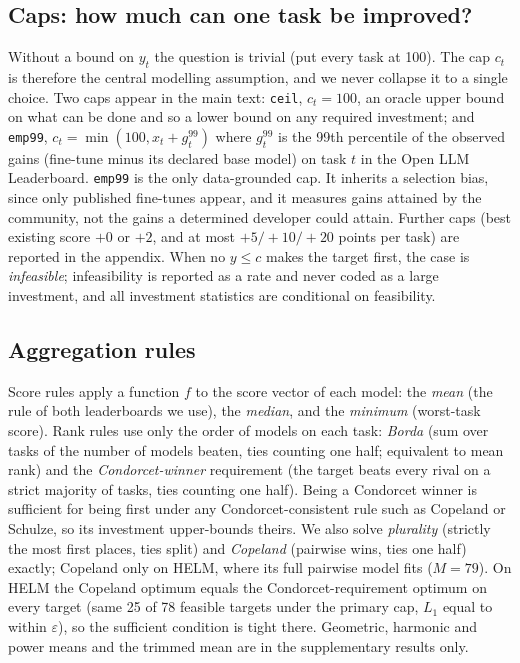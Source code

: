 \documentclass{article}
\begin{document}
\subsection{Caps: how much can one task be improved?}
\label{sec:caps}
Without a bound on $y_t$ the question is trivial (put every task at 100). The cap $c_t$ is therefore the central modelling assumption, and we never collapse it to a single choice. Two caps appear in the main text: \texttt{ceil}, $c_t=100$, an oracle upper bound on what can be done and so a lower bound on any required investment; and \texttt{emp99}, $c_t=\min(100,x_t+g_t^{99})$ where $g_t^{99}$ is the 99th percentile of the observed gains (fine-tune minus its declared base model) on task $t$ in the Open LLM Leaderboard. \texttt{emp99} is the only data-grounded cap. It inherits a selection bias, since only published fine-tunes appear, and it measures gains attained by the community, not the gains a determined developer could attain. Further caps (best existing score $+0$ or $+2$, and at most $+5/+10/+20$ points per task) are reported in the appendix. When no $y\le c$ makes the target first, the case is \emph{infeasible}; infeasibility is reported as a rate and never coded as a large investment, and all investment statistics are conditional on feasibility.

\subsection{Aggregation rules}
\label{sec:rules}
Score rules apply a function $f$ to the score vector of each model: the \emph{mean} (the rule of both leaderboards we use), the \emph{median}, and the \emph{minimum} (worst-task score). Rank rules use only the order of models on each task: \emph{Borda} (sum over tasks of the number of models beaten, ties counting one half; equivalent to mean rank) and the \emph{Condorcet-winner} requirement (the target beats every rival on a strict majority of tasks, ties counting one half). Being a Condorcet winner is sufficient for being first under any Condorcet-consistent rule such as Copeland or Schulze, so its investment upper-bounds theirs. We also solve \emph{plurality} (strictly the most first places, ties split) and \emph{Copeland} (pairwise wins, ties one half) exactly; Copeland only on HELM, where its full pairwise model fits ($M=79$). On HELM the Copeland optimum equals the Condorcet-requirement optimum on every target (same 25 of 78 feasible targets under the primary cap, $L_1$ equal to within $\varepsilon$), so the sufficient condition is tight there. Geometric, harmonic and power means and the trimmed mean are in the supplementary results only.
\end{document}

